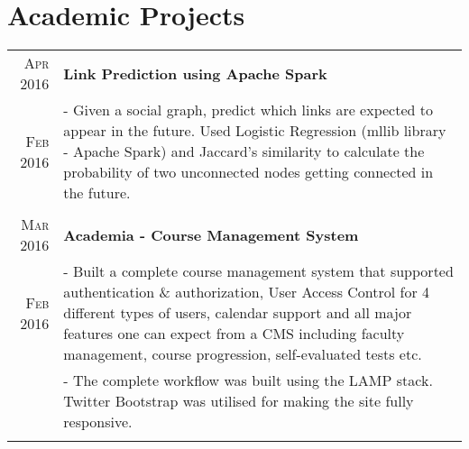 \documentclass[a4paper,10pt]{extarticle} %
\begin{document}

\section{\large{Academic Projects}}

\begin{tabular}{r|p{16cm}}

\textsc{\normalsize{Apr 2016}} & \textbf{\normalsize{Link Prediction using Apache Spark}} \\

\textsc{\normalsize{Feb 2016}}  & \footnotesize{- Given a social graph, predict which links are expected to appear in the future. Used Logistic Regression (mllib library - Apache Spark) and Jaccard's similarity to calculate the probability of two unconnected nodes getting connected in the future.}\\
\multicolumn{2}{c}{} \\


\textsc{\normalsize{Mar 2016}} & \textbf{\normalsize{Academia - Course Management System}}\\
\textsc{\normalsize{Feb 2016}} & \footnotesize{- Built a complete course management system that supported authentication \& authorization, User Access Control for 4 different types of users, calendar support and all major features one can expect from a CMS including faculty management, course progression, self-evaluated tests etc. }\\
& \footnotesize{- The complete workflow was built using the LAMP stack. Twitter Bootstrap was utilised for making the site fully responsive.}\\
\multicolumn{2}{c}{} \\



\end{tabular}
\end{document}
